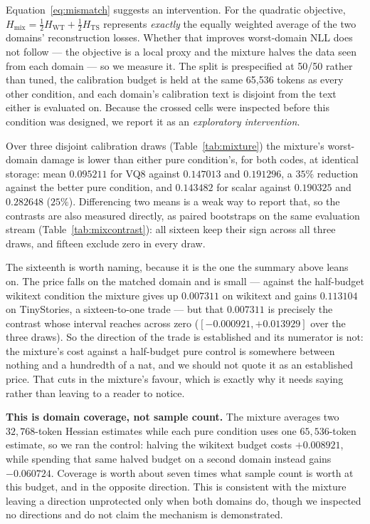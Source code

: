 \documentclass[11pt]{article}
\begin{document}
Equation~\eqref{eq:mismatch} suggests an intervention. For the quadratic
objective, $H_{\mathrm{mix}} = \tfrac12 H_{\mathrm{WT}} + \tfrac12
H_{\mathrm{TS}}$ represents \emph{exactly} the equally weighted average of the
two domains' reconstruction losses. Whether that improves worst-domain NLL does
not follow --- the objective is a local proxy and the mixture halves the data
seen from each domain --- so we measure it. The split is prespecified at 50/50
rather than tuned, the calibration budget is held at the same 65,536 tokens as
every other condition, and each domain's calibration text is disjoint from the
text either is evaluated on. Because the crossed cells were inspected before
this condition was designed, we report it as an \emph{exploratory
intervention}.

Over three disjoint calibration draws (Table~\ref{tab:mixture}) the mixture's
worst-domain damage is lower than either pure condition's, for both codes, at
identical storage: mean $0.095211$ for VQ8 against $0.147013$ and $0.191296$, a
$35\%$ reduction against the better pure condition, and $0.143482$ for scalar
against $0.190325$ and $0.282648$ ($25\%$). Differencing two means is a weak way
to report that, so the contrasts are also measured directly, as paired
bootstraps on the same evaluation stream
(Table~\ref{tab:mixcontrast}): all sixteen keep their sign across all three
draws, and fifteen exclude zero in every draw.

The sixteenth is worth naming, because it is the one the summary above leans
on. The price falls on the matched domain and is small --- against the
half-budget wikitext condition the mixture gives up $0.007311$ on wikitext and
gains $0.113104$ on TinyStories, a sixteen-to-one trade --- but that $0.007311$
is precisely the contrast whose interval reaches across zero
($[-0.000921, +0.013929]$ over the three draws). So the direction of the trade
is established and its numerator is not: the mixture's cost against a
half-budget pure control is somewhere between nothing and a hundredth of a nat,
and we should not quote it as an established price. That cuts in the mixture's
favour, which is exactly why it needs saying rather than leaving to a reader to
notice.

\textbf{This is domain coverage, not sample count.} The mixture averages two
$32{,}768$-token Hessian estimates while each pure condition uses one
$65{,}536$-token estimate, so we ran the control: halving the wikitext budget
costs $+0.008921$, while spending that same halved budget on a second domain
instead gains $-0.060724$. Coverage is worth about seven times what sample
count is worth at this budget, and in the opposite direction. This is
consistent with the mixture leaving a direction unprotected only when both
domains do, though we inspected no directions and do not claim the mechanism is
demonstrated.
\end{document}
